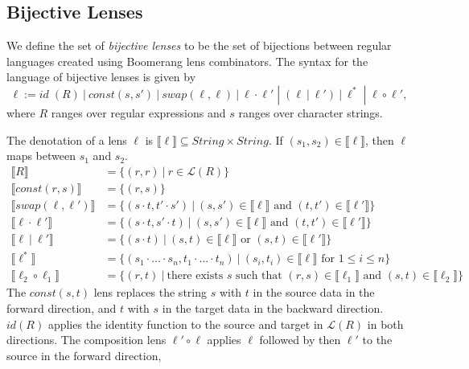 \documentclass[acmsmall,review,anonymous]{acmart}\settopmatter{printfolios=true,printccs=false,printacmref=false}
\newcommand{\sep}{\ensuremath{\ | \ }}
\begin{document}
\subsection{Bijective Lenses}
We define the set of \textit{bijective lenses} to be the set of bijections
between regular languages created using Boomerang lens combinators.
The syntax for the language of bijective lenses is given by
$$\ell := \mathit{id} \; (R) \sep const(s, s') \sep  swap(\ell,
\ell) \sep \ell \cdot \ell' \; |  \; (\ell \sep \ell') \sep \ell^* \;
| \; \ell \circ \ell',$$ where $R$ ranges over regular expressions and $s$
ranges over character strings.

The denotation of a lens $\ell$ is $\llbracket \ell \rrbracket \subseteq
\mathit{String} \times \mathit{String}$. If $(s_1, s_2) \in \llbracket \ell
\rrbracket$, then $\ell$ maps between $s_1$ and $s_2$.
\begin{align*}
\llbracket R \rrbracket &= \{(r, r) \sep r \in \mathcal{L}(R)\}\\
\llbracket const(r, s) \rrbracket &= \{(r, s)\}\\
\llbracket swap(\ell, \ell') \rrbracket &= \{(s \cdot t, t' \cdot s') \sep
(s, s') \in \llbracket \ell \rrbracket \text{ and } (t, t') \in \llbracket
\ell' \rrbracket\}\\
\llbracket \ell \cdot \ell' \rrbracket &= \{(s \cdot t, s' \cdot t) \sep
(s, s') \in \llbracket \ell \rrbracket \text{ and } (t, t') \in \llbracket
\ell' \rrbracket\}\\
\llbracket \ell \sep \ell' \rrbracket &= \{(s \cdot t) \sep
(s, t) \in \llbracket \ell \rrbracket \text{ or } (s, t) \in \llbracket
\ell' \rrbracket\}\\
\llbracket \ell^* \rrbracket &= \{(s_1 \cdot \ldots \cdot s_n, t_1 \cdot \ldots
\cdot t_n) \sep (s_i, t_i) \in \llbracket \ell \rrbracket \text{ for } 1
\leq i \leq n\}\\
\llbracket \ell_2 \circ \ell_1 \rrbracket &= \{(r, t) \sep \text{there exists }s
\text{ such that } (r, s) \in \llbracket \ell_1 \rrbracket \text{ and } (s, t)
\in \llbracket \ell_2 \rrbracket\}
\end{align*}
The $\mathit{const}(s, t)$ lens replaces the string $s$ with $t$ in the source
data in the forward direction, and $t$ with $s$ in the target data in the backward
direction. $\mathit{id}(R)$ applies the identity function to the source and target
in $\mathcal{L}(R)$ in both directions. The composition lens $\ell' \circ \ell$
applies $\ell$ followed by then $\ell'$ to the source in the forward direction,
\end{document}
